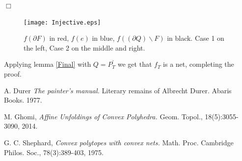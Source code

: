 \documentclass[openright, 12pt]{article}
\begin{document}
\hfill $\Box$


\begin{figure}[h]
\centering
\texttt{[image: Injective.eps]}
\caption{$f(\partial F) $ in red, $f(e)$ in blue, $f((\partial Q )\backslash F)$ in black. Case 1 on the left, Case 2 on the middle and right.}\label{Inj}
\end{figure}

Applying lemma \ref{Final} with $Q=P^{\prime}_T$ we get that $f_T$ is a net, completing the proof.


\begin{thebibliography}{9}

 A. Durer \textit{The painter's manual.} Literary remains of Albrecht Durer. Abaris Books. 1977.

 M. Ghomi, \textit{Affine Unfoldings of Convex Polyhedra.} Geom. Topol., 18(5):3055-3090, 2014. 
  

G. C. Shephard, \textit{Convex polytopes with convex nets.} Math. Proc. Cambridge Philos. Soc., 78(3):389-403, 1975. 
  
  
\end{thebibliography}
\end{document}
